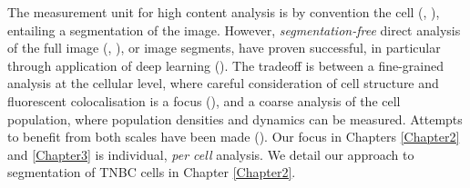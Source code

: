 
The measurement unit for high content analysis is by convention the cell (\cite{perlman2004multidimensional}, \cite{adams2006compound}), entailing a segmentation of the image. However, \emph{segmentation-free} direct analysis of the full image (\cite{orlov2008wnd}, \cite{uhlmann2016cp}), or image segments, have proven successful, in particular through application of deep learning (\cite{kraus2016classifying}). The tradeoff is between a fine-grained analysis at the cellular level, where careful consideration of cell structure and fluorescent colocalisation is a focus (\cite{slack2008characterizing}), and a coarse analysis of the cell population, where population densities and dynamics can be measured. Attempts to benefit from both scales have been made (\cite{godinez2017multi}). Our focus in Chapters \ref{Chapter2} and \ref{Chapter3} is individual, \emph{per cell} analysis. We detail our approach to segmentation of TNBC cells in Chapter \ref{Chapter2}.

